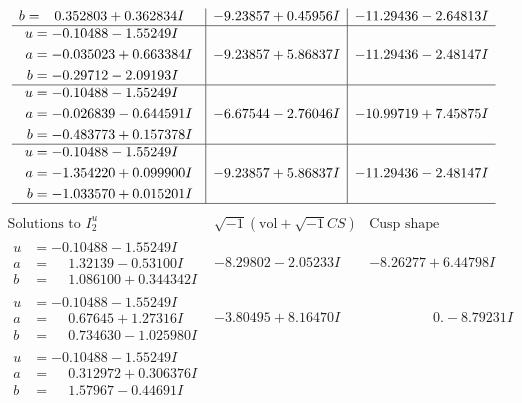 \documentclass[1p]{elsarticle_modified}
\theoremstyle{definition}
\newcommand{\I}{\sqrt{-1}}
\begin{document}
$$\begin{array}{c|c|c}
\begin{aligned}
b &= \phantom{-}0.352803 + 0.362834 I\end{aligned}
 & -9.23857 + 0.45956 I & -11.29436 - 2.64813 I \\ \hline\begin{aligned}
u &= -0.10488 - 1.55249 I \\
a &= -0.035023 + 0.663384 I \\
b &= -0.29712 - 2.09193 I\end{aligned}
 & -9.23857 + 5.86837 I & -11.29436 - 2.48147 I \\ \hline\begin{aligned}
u &= -0.10488 - 1.55249 I \\
a &= -0.026839 - 0.644591 I \\
b &= -0.483773 + 0.157378 I\end{aligned}
 & -6.67544 - 2.76046 I & -10.99719 + 7.45875 I \\ \hline\begin{aligned}
u &= -0.10488 - 1.55249 I \\
a &= -1.354220 + 0.099900 I \\
b &= -1.033570 + 0.015201 I\end{aligned}
 & -9.23857 + 5.86837 I & -11.29436 - 2.48147 I\\
 \hline 
 \end{array}$$\newpage$$\begin{array}{c|c|c}  
\text{Solutions to }I^u_{2}& \I (\text{vol} + \sqrt{-1}CS) & \text{Cusp shape}\\
 \hline 
\begin{aligned}
u &= -0.10488 - 1.55249 I \\
a &= \phantom{-}1.32139 - 0.53100 I \\
b &= \phantom{-}1.086100 + 0.344342 I\end{aligned}
 & -8.29802 - 2.05233 I & -8.26277 + 6.44798 I \\ \hline\begin{aligned}
u &= -0.10488 - 1.55249 I \\
a &= \phantom{-}0.67645 + 1.27316 I \\
b &= \phantom{-}0.734630 - 1.025980 I\end{aligned}
 & -3.80495 + 8.16470 I & \phantom{-0.000000 } 0. - 8.79231 I \\ \hline\begin{aligned}
u &= -0.10488 - 1.55249 I \\
a &= \phantom{-}0.312972 + 0.306376 I \\
b &= \phantom{-}1.57967 - 0.44691 I\end{aligned}

\end{array}$$
\end{document}
